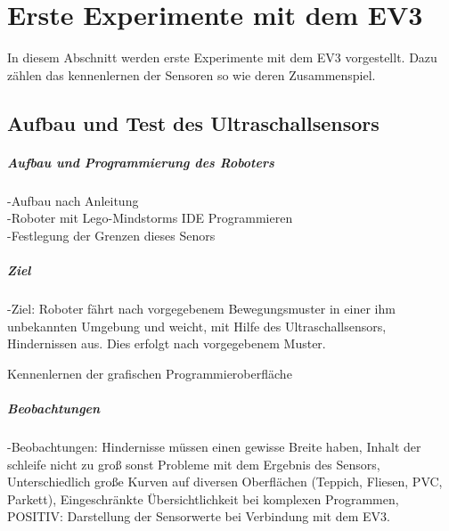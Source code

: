 \chapter{Erste Experimente mit dem EV3}
In diesem Abschnitt werden erste Experimente mit dem EV3 vorgestellt. Dazu zählen das kennenlernen der Sensoren so wie deren Zusammenspiel. 
\section{Aufbau und Test des Ultraschallsensors}
\paragraph{Aufbau und Programmierung des Roboters}
-Aufbau nach Anleitung\\
-Roboter mit Lego-Mindstorms IDE Programmieren \\
-Festlegung der Grenzen dieses Senors\\
\paragraph{Ziel}
-Ziel: Roboter fährt nach vorgegebenem Bewegungsmuster in einer ihm unbekannten Umgebung und weicht, mit Hilfe des Ultraschallsensors, Hindernissen aus. Dies erfolgt nach vorgegebenem Muster.

Kennenlernen der grafischen Programmieroberfläche\\ 
\paragraph{Beobachtungen}
-Beobachtungen: Hindernisse müssen einen gewisse Breite haben, Inhalt der schleife nicht zu groß sonst Probleme mit dem Ergebnis des Sensors, Unterschiedlich große Kurven auf diversen Oberflächen (Teppich, Fliesen, PVC, Parkett), Eingeschränkte Übersichtlichkeit bei komplexen Programmen,
POSITIV: Darstellung der Sensorwerte bei Verbindung mit dem EV3. \\
